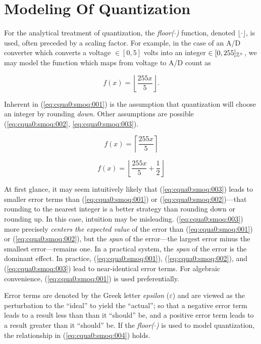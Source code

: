 \section{Modeling Of Quantization}

For the analytical treatment of quantization, the \emph{floor($\cdot{}$)}
function, denoted $\lfloor \cdot \rfloor$, is used, often preceded by a
scaling factor.  For example, in the case of an A/D converter which
converts a voltage $\in [0, 5]$ volts into an integer
$\in [0,255]_{{\mathbb{Z}^+}{}}$, we may model the function which
maps from voltage to A/D count as

\begin{equation}
\label{eq:cqua0:smoq:001}
f(x) = \left\lfloor {\frac{255 x }{5}} \right\rfloor .
\end{equation}

Inherent in (\ref{eq:cqua0:smoq:001})
is the assumption that quantization will
choose an integer by rounding \emph{down}.  Other
assumptions are possible
(\ref{eq:cqua0:smoq:002}, \ref{eq:cqua0:smoq:003}).

\begin{equation}
\label{eq:cqua0:smoq:002}
f(x) = \left\lceil {\frac{255 x }{5}} \right\rceil
\end{equation}

\begin{equation}
\label{eq:cqua0:smoq:003}
f(x) = \left\lfloor {\frac{255 x }{5} + \frac{1}{2}} \right\rfloor
\end{equation}

At first glance, it may seem intuitively likely
that (\ref{eq:cqua0:smoq:003}) leads
to smaller error terms than (\ref{eq:cqua0:smoq:001})
or (\ref{eq:cqua0:smoq:002})---that rounding to the
nearest integer is a better strategy than rounding
down or rounding up.  In this case, intuition may be misleading.
(\ref{eq:cqua0:smoq:003}) more precisely \emph{centers the
expected value} of the error than (\ref{eq:cqua0:smoq:001})
or (\ref{eq:cqua0:smoq:002}), but the \emph{span} of the
error---the largest error minus the smallest error---remains
one.  In a practical system, the \emph{span} of the error
is the dominant effect.  In practice,
(\ref{eq:cqua0:smoq:001}), (\ref{eq:cqua0:smoq:002}),
and (\ref{eq:cqua0:smoq:003}) lead to near-identical
error terms.  For algebraic convenience,
(\ref{eq:cqua0:smoq:001}) is used preferentially.

Error terms are denoted by the Greek
letter \emph{epsilon} ($\varepsilon$) and
are viewed as the perturbation to the
``ideal'' to yield the ``actual''; so that a negative error
term leads to a result less than than it
``should'' be, and a positive
error term leads to a result greater than
it ``should'' be.  If the \emph{floor($\cdot{}$)}
is used to model quantization, the relationship
in (\ref{eq:cqua0:smoq:004}) holds.

